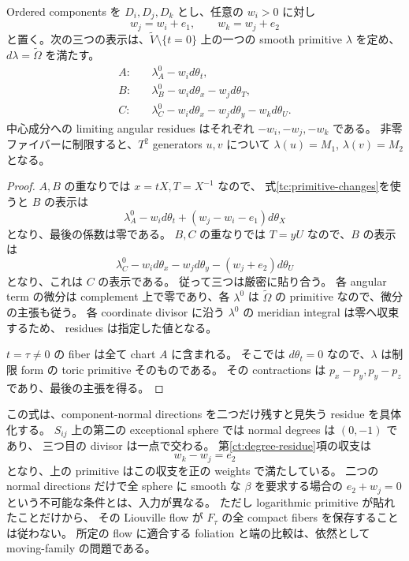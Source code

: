 \begin{proposition}
\label{tc:primitive-proposition}
Ordered components を $D_i,D_j,D_k$ とし、任意の $w_i>0$ に対し
\[
 w_j=w_i+e_1,\qquad w_k=w_j+e_2
\]
と置く。次の三つの表示は、$\widetilde V\setminus\{t=0\}$ 上の一つの smooth primitive
$\lambda$ を定め、$d\lambda=\widetilde\Omega$ を満たす。
\begin{equation}\label{tc:primitive-global}
\begin{aligned}
 A:\quad&\lambda_A^0-w_i d\theta_t,\\
 B:\quad&\lambda_B^0-w_i d\theta_x-w_jd\theta_T,\\
 C:\quad&\lambda_C^0-w_i d\theta_x-w_jd\theta_y-w_kd\theta_U.
\end{aligned}
\end{equation}
中心成分への limiting angular residues はそれぞれ $-w_i,-w_j,-w_k$ である。
非零ファイバーに制限すると、$T^2$ generators $u,v$ について
$\lambda(u)=M_1$, $\lambda(v)=M_2$ となる。
\end{proposition}

\begin{proof}
$A,B$ の重なりでは $x=tX,T=X^{-1}$ なので、
式\eqref{tc:primitive-changes}を使うと $B$ の表示は
\[
 \lambda_A^0-w_i d\theta_t
       +(w_j-w_i-e_1)d\theta_X
\]
となり、最後の係数は零である。
$B,C$ の重なりでは $T=yU$ なので、$B$ の表示は
\[
 \lambda_C^0-w_i d\theta_x-w_jd\theta_y
       -(w_j+e_2)d\theta_U
\]
となり、これは $C$ の表示である。
従って三つは厳密に貼り合う。
各 angular term の微分は complement 上で零であり、各 $\lambda^0$ は
$\widetilde\Omega$ の primitive なので、微分の主張も従う。
各 coordinate divisor に沿う $\lambda^0$ の meridian integral は零へ収束するため、
residues は指定した値となる。

$t=\tau\ne0$ の fiber は全て chart $A$ に含まれる。
そこでは $d\theta_t=0$ なので、$\lambda$ は制限 form の toric primitive そのものである。
その contractions は $p_x-p_y,p_y-p_z$ であり、最後の主張を得る。
\end{proof}

この式は、component-normal directions を二つだけ残すと見失う residue を具体化する。
$S_{ij}$ 上の第二の exceptional sphere では normal degrees は $(0,-1)$ であり、
三つ目の divisor は一点で交わる。
第\ref{ct:degree-residue}項の収支は
\[
 w_k-w_j=e_2
\]
となり、上の primitive はこの収支を正の weights で満たしている。
二つの normal directions だけで全 sphere に smooth な $\beta$ を要求する場合の
$e_2+w_j=0$ という不可能な条件とは、入力が異なる。
ただし logarithmic primitive が貼れたことだけから、
その Liouville flow が $F_\tau$ の全 compact fibers を保存することは従わない。
所定の flow に適合する foliation と端の比較は、依然として moving-family の問題である。

